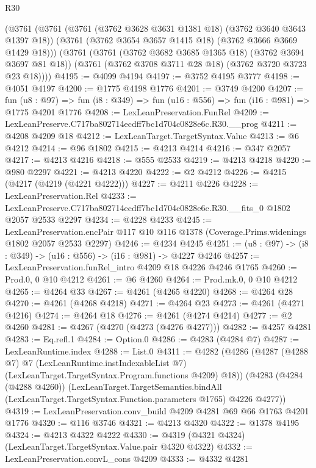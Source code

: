 \begin{lexlean}{R30}
\begin{coremodule}
    (@3761
      (@3761
        (@3761 (@3762 @3628 @3631 @1381 @18) (@3762 @3640 @3643 @1397 @18))
        (@3761 (@3762 @3654 @3657 @1415 @18) (@3762 @3666 @3669 @1429 @18)))
      (@3761
        (@3761 (@3762 @3682 @3685 @1365 @18) (@3762 @3694 @3697 @81 @18))
        (@3761 (@3762 @3708 @3711 @28 @18) (@3762 @3720 @3723 @23 @18))))
@4195 := @4099 @4194
@4197 := @3752 @4195 @3777
@4198 := @4051 @4197
@4200 := @1775 @4198 @1776
@4201 := @3749 @4200
@4207 := fun (u8 : @97) =>
  fun (i8 : @349) => fun (u16 : @556) => fun (i16 : @981) => @1775 @4201 @1776
@4208 := LexLeanPreservation.FunRel
@4209 := LexLeanPreserve.C717ba802714ecdff7bc1d704c0828e6c.R30.__prog
@4211 := @4208 @4209 @18
@4212 := LexLeanTarget.TargetSyntax.Value
@4213 := @6 @4212
@4214 := @96 @1802
@4215 := @4213 @4214
@4216 := @347 @2057
@4217 := @4213 @4216
@4218 := @555 @2533
@4219 := @4213 @4218
@4220 := @980 @2297
@4221 := @4213 @4220
@4222 := @2 @4212
@4226 := @4215 (@4217 (@4219 (@4221 @4222)))
@4227 := @4211 @4226
@4228 := LexLeanPreservation.Rel
@4233 := LexLeanPreserve.C717ba802714ecdff7bc1d704c0828e6c.R30.__fits_0 @1802 @2057 @2533 @2297
@4234 := @4228 @4233
@4245 := LexLeanPreservation.encPair
    @117
    @10
    @116
    @1378
    (Coverage.Prims.widenings @1802 @2057 @2533 @2297)
@4246 := @4234 @4245
@4251 := (u8 : @97) -> (i8 : @349) -> (u16 : @556) -> (i16 : @981) -> @4227 @4246
@4257 := LexLeanPreservation.funRel_intro @4209 @18 @4226 @4246 @1765
@4260 := Prod.{0, 0} @10 @4212
@4261 := @6 @4260
@4264 := Prod.mk.{0, 0} @10 @4212
@4265 := @4264 @33
@4267 := @4261 (@4265 @4220)
@4268 := @4264 @28
@4270 := @4261 (@4268 @4218)
@4271 := @4264 @23
@4273 := @4261 (@4271 @4216)
@4274 := @4264 @18
@4276 := @4261 (@4274 @4214)
@4277 := @2 @4260
@4281 := @4267 (@4270 (@4273 (@4276 @4277)))
@4282 := @4257 @4281
@4283 := Eq.refl.{1}
@4284 := Option.{0}
@4286 := @4283 (@4284 @7)
@4287 := LexLeanRuntime.index
@4288 := List.{0}
@4311 := @4282
    (@4286
      (@4287
        (@4288 @7)
        @7
        (LexLeanRuntime.instIndexableList @7)
        (LexLeanTarget.TargetSyntax.Program.functions @4209)
        @18))
    (@4283
      (@4284 (@4288 @4260))
      (LexLeanTarget.TargetSemantics.bindAll
        (LexLeanTarget.TargetSyntax.Function.parameters @1765)
        @4226
        @4277))
@4319 := LexLeanPreservation.conv_build @4209 @4281 @69 @66 @1763 @4201 @1776
@4320 := @116 @3746
@4321 := @4213 @4320
@4322 := @1378 @4195
@4324 := @4213 @4322 @4222
@4330 := @4319 (@4321 @4324) (LexLeanTarget.TargetSyntax.Value.pair @4320 @4322)
@4332 := LexLeanPreservation.convL_cons @4209
@4333 := @4332 @4281

\end{coremodule}
\end{lexlean}
